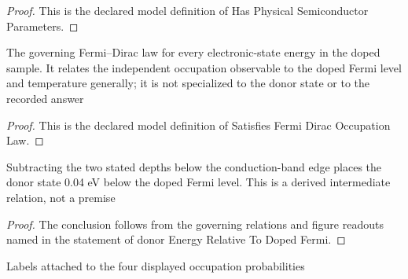 \begin{proof}
  This is the declared model definition of Has Physical Semiconductor Parameters.
\end{proof}
\begin{definition}
  \label{def:physics:phyx-mini-0575:phyxminiproblems-problemphyxmini0575-satisfiesfermidiracoccupationlaw}
  The governing Fermi--Dirac law for every electronic-state energy in the doped sample. It relates the independent occupation observable to the doped Fermi level and temperature generally; it is not specialized to the donor state or to the recorded answer
\end{definition}
\begin{proof}
  This is the declared model definition of Satisfies Fermi Dirac Occupation Law.
\end{proof}
\begin{lemma}
  \label{lem:physics:phyx-mini-0575:phyxminiproblems-problemphyxmini0575-donorenergyrelativetodopedfermi}
  Subtracting the two stated depths below the conduction-band edge places the donor state 0.04 eV below the doped Fermi level. This is a derived intermediate relation, not a premise
\end{lemma}
\begin{proof}
  The conclusion follows from the governing relations and figure readouts named in the statement of donor Energy Relative To Doped Fermi.
\end{proof}
\begin{definition}
  \label{def:physics:phyx-mini-0575:phyxminiproblems-problemphyxmini0575-answerchoice}
  Labels attached to the four displayed occupation probabilities
\end{definition}
